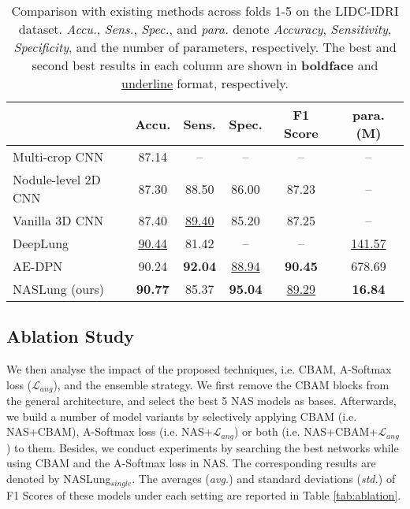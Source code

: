 \documentclass[final,5p,times,twocolumn]{elsarticle}
\begin{document}
\begin{table*}
\centering
\caption{Comparison with existing methods across folds 1-5 on the LIDC-IDRI dataset. \textit{Accu.}, \textit{Sens.}, \textit{Spec.}, and \textit{para.} denote \textit{Accuracy}, \textit{Sensitivity}, \textit{Specificity}, and the number of parameters, respectively. The best and second best results in each column are shown in \textbf{boldface} and \underline{underline} format, respectively.}
\small
\label{tab:pfm_comp}
\begin{tabular}{l|ccccc}
\toprule
 			& Accu.	& Sens.	& Spec.	& F1 Score & para. (M)	\\	
\midrule	
Multi-crop CNN \citep{shen2017multi} &  	87.14 	&	--	&	--	&	--	&	--	\\
Nodule-level 2D CNN \citep{yan2016classification} & 	87.30 	&	88.50 	&	86.00	&	87.23 &	--		\\
Vanilla 3D CNN \citep{yan2016classification} & 	87.40 	&	\underline{89.40} 	&	85.20	&	87.25 &	--			\\
DeepLung \citep{zhu2018deeplung} &  	\underline{90.44} 	&	81.42 	&	--	&	--	& \underline{141.57} \\
AE-DPN \citep{JIANG2019AEDPN}  & 	90.24	&	\textbf{92.04}	&	\underline{88.94}	&	\textbf{90.45} & 678.69	\\
\midrule
NASLung (ours) &	\textbf{90.77}	&	85.37 	&	\textbf{95.04} 	&	\underline{89.29} 	&	\textbf{16.84} 	\\
\bottomrule												
\end{tabular}
\end{table*}






\subsection{Ablation Study}
\label{ssec:exp_ablation}
We then analyse the impact of the proposed techniques, i.e. CBAM, A-Softmax loss ($\mathcal{L}_{ang}$), and the ensemble strategy. 
We first remove the CBAM blocks from the general architecture, and select the best 5 NAS models as bases. Afterwards, we build a number of model variants by selectively applying CBAM (i.e. NAS+CBAM), A-Softmax loss (i.e. NAS+$\mathcal{L}_{ang}$) or both (i.e. NAS+CBAM+$\mathcal{L}_{ang}$) to them. 
Besides, we conduct experiments by searching the best networks while using CBAM and the A-Softmax loss in NAS. The corresponding results are denoted by NASLung$_{single}$. 
The averages (\textit{avg.}) and standard deviations (\textit{std.}) of F1 Scores of these models under each setting are reported in Table \ref{tab:ablation}. 
\end{document}
